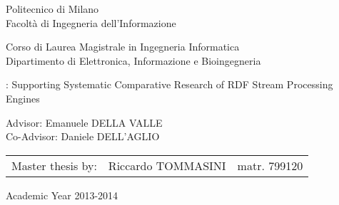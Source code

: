 \begin{titlepage}
\vspace*{-2.5cm}
\bfseries
\begin{center}
  \LARGE
  Politecnico di Milano\\
  \Large
  Facolt\`{a} di Ingegneria dell'Informazione\\


\begin{large}
Corso di Laurea Magistrale in Ingegneria Informatica\\
Dipartimento di Elettronica, Informazione e Bioingegneria\\
\end{large}

\vspace{1.0cm}
\begin{Large}
\namens: Supporting Systematic Comparative Research of RDF Stream Processing Engines
\end{Large}  
\end{center}
\vspace*{5.5cm}
\large
\begin{flushleft}
\hspace{-2cm}  Advisor: Emanuele DELLA VALLE\\
\hspace{-2cm}  Co-Advisor: Daniele DELL'AGLIO\\
\end{flushleft}
\vspace*{1.5cm}

\hspace{1.5cm}
\parbox{14cm}{
    \begin{tabular}{lll}
        Master thesis by: & Riccardo TOMMASINI    & matr. 799120\\
    \end{tabular}
}

\vspace*{1.4cm}
\begin{center}

  Academic Year 2013-2014



\end{center}
\end{titlepage}
\cleardoublepage

\thispagestyle{empty}

